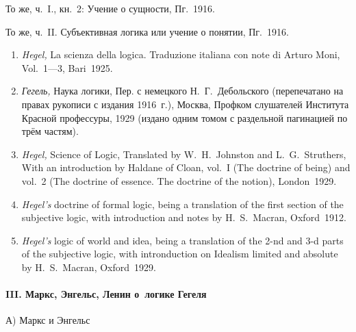 То же, ч.~I., кн.~2: Учение о сущности, Пг.~1916.

То же, ч.~II. Субъективная логика или учение о понятии, Пг.~1916.

\begin{enumerate}
\item
{\em Hegel,} La scienza della logica. Traduzione italiana con note di
Arturo Moni, Vol.~1---3, Bari~1925.

\item
{\em Гегель,} Наука логики, Пер. с немецкого Н.~Г.~Дебольского
(перепечатано на правах рукописи с издания 1916~г.), Москва, Профком
слушателей Института Красной профессуры, 1929 (издано одним томом с
раздельной пагинацией по трём частям).

\item
{\em Hegel,} Science of Logic, Translated by W.~H.~Johnston and
L.~G.~Struthers, With an intro\-duction by Haldane of Cloan, vol.~I
(The doctrine of being) and vol.~2 (The doctrine of essence. The doctrine of
the notion), London~1929.

\item{\em Hegel's} doctrine of formal logic, being a translation of the first
section of the subjective logic, with intro\-duction and notes by
H.~S.~Macran, Oxford~1912.

\item{\em Hegel's} logic of world and idea, being a translation of the 2-nd and
3-d parts of the subjective logic, with intro\-nduction on Idealism limited and
absolute by H.~S.~Macran, Oxford~1929.
\end{enumerate}

\paragraph%
[III. Маркс, Энгельс, Ленин о~логике Гегеля]%
{III. Маркс, Энгельс, Ленин о~логике Гегеля}

{\centering А) Маркс и Энгельс \par}

